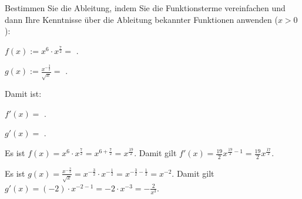 \begin{MExercises}

\begin{MExercise}
Bestimmen Sie die Ableitung, indem Sie die Funktionsterme vereinfachen und 
dann Ihre Kenntnisse über die Ableitung bekannter Funktionen anwenden
($x > 0$):
\begin{MExerciseItems}
\item $f(x) := x^6 \cdot x^{\frac{7}{2}} = $
. %
\item $g(x) := \frac{x^{-\frac{3}{2}}}{\sqrt{x}} = $
.
\end{MExerciseItems}
Damit ist:
\begin{MExerciseItems}
\item $f'(x) = $ .
\item $g'(x) = $ .
\end{MExerciseItems}
\begin{MHint}{\iSolution}
 \begin{MExerciseItems}
  \item Es ist $f(x) = x^6 \cdot x^\frac72 = x^{6 + \frac72} = x^\frac{19}{2}$.
  Damit gilt $f'(x) = \frac{19}{2} x^{\frac{19}{2} - 1} = \frac{19}{2} x^\frac{17}{2}$.
  \item Es ist $g(x) = \frac{x^{-\frac32}}{\sqrt{x}} = x^{- \frac32} \cdot x^{- \frac12} = x^{- \frac32 - \frac12} = x^{-2}$.
  Damit gilt $g'(x) = (-2) \cdot x^{-2 -1} = -2 \cdot x^{-3} = - \frac{2}{x^3}$.
 \end{MExerciseItems}
\end{MHint}
\end{MExercise}


\end{MExercises}
